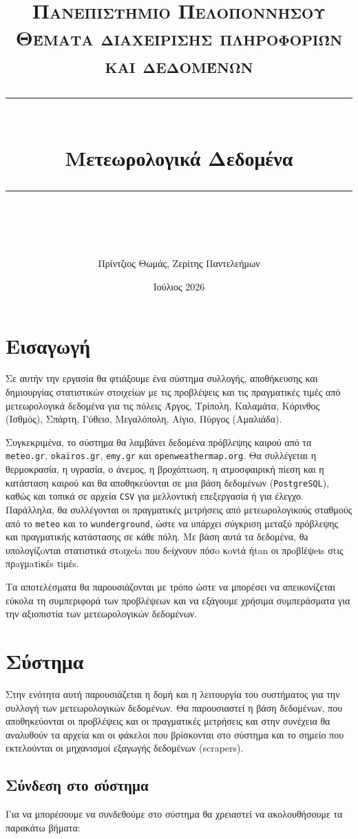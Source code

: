 \documentclass[a4paper,12pt]{article}
\title{
\normalfont \normalsize 
\textsc{Πανεπιστήμιο Πελοποννήσου\\ 
Θέματα διαχείρισης πληροφοριών και δεδομένων} \\
[10pt] 
\rule{\linewidth}{0.5pt} \\[6pt] 
\huge Μετεωρολογικά Δεδομένα\\
\rule{\linewidth}{2pt}  \\[10pt]
}
\author{Πρίντζιος Θωμάς, Ζερίτης Παντελεήμων}
\begin{document}
\date{Ιούλιος 2026}

\maketitle

\tableofcontents

\newpage
%
%
\section{Εισαγωγή}\label{sec:introduction}
Σε αυτήν την εργασία θα φτιάξουμε ένα σύστημα συλλογής, αποθήκευσης και δημιουργίας στατιστικών στοιχείων με τις προβλέψεις και τις πραγματικές τιμές από μετεωρολογικά δεδομένα για τις πόλεις Άργος, Τρίπολη, Καλαμάτα, Κόρινθος (Ισθμός), Σπάρτη, Γύθειο, Μεγαλόπολη, Αίγιο, Πύργος (Αμαλιάδα).

Συγκεκριμένα, το σύστημα θα λαμβάνει δεδομένα πρόβλεψης καιρού από τα \texttt{meteo.gr}, \texttt{okairos.gr}, \texttt{emy.gr} και \texttt{openweathermap.org}. Θα συλλέγεται η θερμοκρασία, η υγρασία, ο άνεμος, η βροχόπτωση, η ατμοσφαιρική πίεση και η κατάσταση καιρού και θα αποθηκεύονται σε μια βάση δεδομένων (\texttt{PostgreSQL}), καθώς και τοπικά σε αρχεία \texttt{CSV} για μελλοντική επεξεργασία ή για έλεγχο. Παράλληλα, θα συλλέγονται οι πραγματικές μετρήσεις από μετεωρολογικούς σταθμούς από το \texttt{meteo} και το \texttt{wunderground}, ώστε να υπάρχει σύγκριση μεταξύ πρόβλεψης και πραγματικής κατάστασης σε κάθε πόλη. Με βάση αυτά τα δεδομένα, θа υπολογίζoνται στατιστικά στoιχeίa που δeίχνουν πόσo κoνtά ήtan οι πρoβlέψeιs σtις πρaγμaτiκέs τiμέs.

Τα αποτελέσματα θα παρουσιάζονται με τρόπο ώστε να μπορέσει να απεικονίζεται εύκολα τη συμπεριφορά των προβλέψεων και να εξάγουμε χρήσιμα συμπεράσματα για την αξιοπιστία των μετεωρολογικών δεδομένων.




\section{Σύστημα}\label{sec:res}
Στην ενότητα αυτή παρουσιάζεται η δομή και η λειτουργία του συστήματος για την συλλογή των μετεωρολογικών δεδομένων. Θα παρουσιαστεί η βάση δεδομένων, που αποθηκεύονται οι προβλέψεις και οι πραγματικές μετρήσεις και στην συνέχεια θα αναλυθούν τα αρχεία και οι φάκελοι που βρίσκονται στο σύστημα και το σημείο που εκτελούνται οι μηχανισμοί εξαγωγής δεδομένων (scrapers).

\subsection{Σύνδεση στο σύστημα}\label{sec:connect_to_server}
Για να μπορέσουμε να συνδεθούμε στο σύστημα θα χρειαστεί να ακολουθήσουμε τα παρακάτω βήματα:
\end{document}
